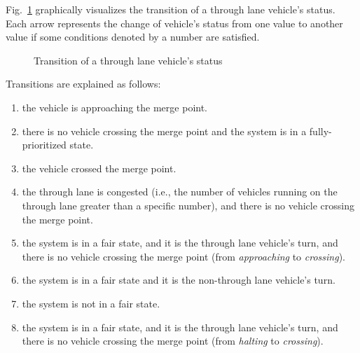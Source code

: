 \documentclass[10pt, conference, compsocconf]{IEEEtran}
\begin{document}
Fig.~\ref{throughLaneStatus} graphically visualizes the transition of a through lane vehicle's status.
Each arrow represents the change of vehicle's status from one value to another value if some conditions denoted by a number are satisfied.

\begin{figure}[h]
\begin{center}
\end{center}
\caption{Transition of a through lane vehicle's status}
\label{throughLaneStatus}
\end{figure}

Transitions are explained as follows:
\begin{enumerate}[]
    \item the vehicle is approaching the merge point. %
    \item there is no vehicle crossing the merge point and the system is in a fully-prioritized state. %
    \item the vehicle crossed the merge point. %
    \item the through lane is congested (i.e., the number of vehicles running on the through lane greater than a specific number), and there is no vehicle crossing the merge point.  %
    \item the system is in a fair state, and it is the through lane vehicle's turn, and there is no vehicle crossing the merge point (from \textit{approaching} to \textit{crossing}). %
    \item the  system is in a fair state and it is the non-through lane vehicle's turn. %
    \item the  system is not in a fair state. %
    \item the system is in a fair state, and it is the through lane vehicle's turn, and there is no vehicle crossing the merge point (from \textit{halting} to \textit{crossing}). %
\end{enumerate}
\end{document}
